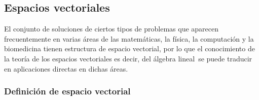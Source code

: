 \documentclass[apuntes]{subfiles}
\begin{document}
\newpage
\subsection*{Espacios vectoriales} \label{Ssec: Espacios vectoriales}

El conjunto de soluciones de ciertos tipos de problemas que aparecen frecuentemente en varias áreas de las matemáticas, la física, la computación y la biomedicina tienen estructura de espacio vectorial, por lo que el conocimiento de la teoría de los espacios vectoriales \textemdash es decir, del álgebra lineal\textemdash \ se puede traducir en aplicaciones directas en dichas áreas. 

\subsubsection*{Definición de espacio vectorial} \label{Sssec: Definición de espacio vectorial}
\end{document}
